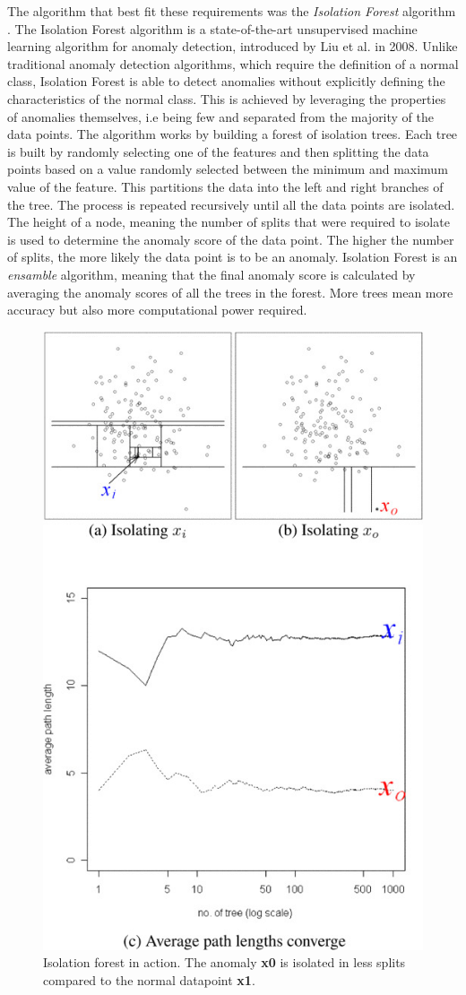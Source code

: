 \documentclass[futureinternet,article,submit,pdftex,moreauthors]{Definitions/mdpi}
\begin{document}
The algorithm that best fit these requirements was the \textit{Isolation Forest} algorithm \cite{IsolationForestLiu}. The Isolation Forest algorithm is a state-of-the-art unsupervised machine learning algorithm for anomaly detection, introduced by Liu et al. in 2008. 
Unlike traditional anomaly detection algorithms, which require the definition of a normal class, Isolation Forest is able to detect anomalies without explicitly defining the characteristics of the normal class.
This is achieved by leveraging the properties of anomalies themselves, i.e being few and separated from the majority of the data points. 
The algorithm works by building a forest of isolation trees. Each tree is built by randomly selecting one of the features and then splitting the data points based on a value randomly selected between the minimum and maximum value of the feature. This partitions the data into the 
left and right branches of the tree. The process is repeated recursively until all the data points are isolated. The height of a node, meaning the number of splits that were required to isolate is used to determine the anomaly score of the data point. The higher the number of splits, the more likely the data point is to be an anomaly.
Isolation Forest is an \textit{ensamble} algorithm, meaning that the final anomaly score is calculated by averaging the anomaly scores of all the trees in the forest. More trees mean more accuracy but also more computational power required.

\begin{figure}[H]
	\includegraphics[width=7 cm]{img/IsolationForest.jpg}
	\caption{Isolation forest in action. The anomaly \textbf{x0} is isolated in less splits compared to the normal datapoint \textbf{x1}\cite{IsolationForestLiu}.}
	\label{fig:IsolationForest}
\end{figure}   
\unskip
\end{document}
